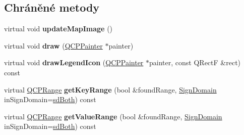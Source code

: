 \subsection*{Chráněné metody}
\begin{DoxyCompactItemize}
\item 
\hypertarget{classQCPColorMap_a5efcea591bb5486d968af520a4d43c3a}{}virtual void {\bfseries update\+Map\+Image} ()\label{classQCPColorMap_a5efcea591bb5486d968af520a4d43c3a}

\item 
\hypertarget{classQCPColorMap_a3b0f45a3177be9522d5e9b8cd8ae122d}{}virtual void {\bfseries draw} (\hyperlink{classQCPPainter}{Q\+C\+P\+Painter} $\ast$painter)\label{classQCPColorMap_a3b0f45a3177be9522d5e9b8cd8ae122d}

\item 
\hypertarget{classQCPColorMap_a7d5eee89f6b8eaf2f11f1d94e32215b2}{}virtual void {\bfseries draw\+Legend\+Icon} (\hyperlink{classQCPPainter}{Q\+C\+P\+Painter} $\ast$painter, const Q\+Rect\+F \&rect) const \label{classQCPColorMap_a7d5eee89f6b8eaf2f11f1d94e32215b2}

\item 
\hypertarget{classQCPColorMap_a0d89371f8707f12e22737b863f1a5126}{}virtual \hyperlink{classQCPRange}{Q\+C\+P\+Range} {\bfseries get\+Key\+Range} (bool \&found\+Range, \hyperlink{classQCPAbstractPlottable_a661743478a1d3c09d28ec2711d7653d8}{Sign\+Domain} in\+Sign\+Domain=\hyperlink{classQCPAbstractPlottable_a661743478a1d3c09d28ec2711d7653d8a082b98cfb91a7363a3b5cd17b0c1cd60}{sd\+Both}) const \label{classQCPColorMap_a0d89371f8707f12e22737b863f1a5126}

\item 
\hypertarget{classQCPColorMap_ac1b906e05ca9b61680e61b74b3825a22}{}virtual \hyperlink{classQCPRange}{Q\+C\+P\+Range} {\bfseries get\+Value\+Range} (bool \&found\+Range, \hyperlink{classQCPAbstractPlottable_a661743478a1d3c09d28ec2711d7653d8}{Sign\+Domain} in\+Sign\+Domain=\hyperlink{classQCPAbstractPlottable_a661743478a1d3c09d28ec2711d7653d8a082b98cfb91a7363a3b5cd17b0c1cd60}{sd\+Both}) const \label{classQCPColorMap_ac1b906e05ca9b61680e61b74b3825a22}

\end{DoxyCompactItemize}
